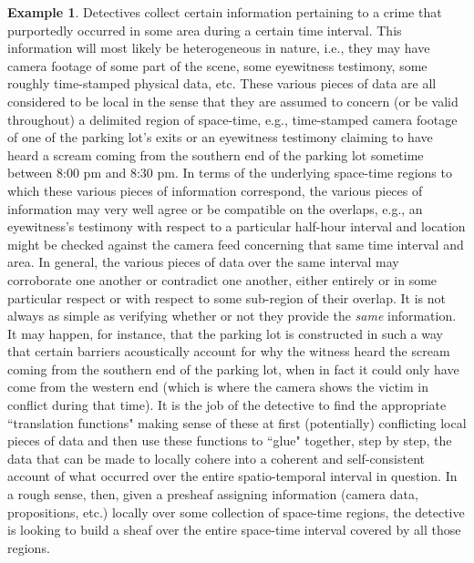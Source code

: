 \documentclass[11pt]{book}
\theoremstyle{definition}
\newtheorem{example}{Example}[section]
\theoremstyle{definition}
\theoremstyle{definition}
\theoremstyle{theorem}
\theoremstyle{definition}
\begin{document}
\begin{example}
	Detectives collect certain information pertaining to a crime that purportedly occurred in some area during a certain time interval. This information will most likely be heterogeneous in nature, i.e., they may have camera footage of some part of the scene, some eyewitness testimony, some roughly time-stamped physical data, etc. These various pieces of data are all considered to be local in the sense that they are assumed to concern (or be valid throughout) a delimited region of space-time, e.g., time-stamped camera footage of one of the parking lot's exits or an eyewitness testimony claiming to have heard a scream coming from the southern end of the parking lot sometime between 8:00 pm and 8:30 pm. In terms of the underlying space-time regions to which these various pieces of information correspond, the various pieces of information may very well agree or be compatible on the overlaps, e.g., an eyewitness's testimony with respect to a particular half-hour interval and location might be checked against the camera feed concerning that same time interval and area. In general, the various pieces of data over the same interval may corroborate one another or contradict one another, either entirely or in some particular respect or with respect to some sub-region of their overlap. It is not always as simple as verifying whether or not they provide the \textit{same} information. It may happen, for instance, that the parking lot is constructed in such a way that certain barriers acoustically account for why the witness heard the scream coming from the southern end of the parking lot, when in fact it could only have come from the western end (which is where the camera shows the victim in conflict during that time). It is the job of the detective to find the appropriate ``translation functions" making sense of these at first (potentially) conflicting local pieces of data and then use these functions to ``glue" together, step by step, the data that can be made to locally cohere into a coherent and self-consistent account of what occurred over the entire spatio-temporal interval in question. In a rough sense, then, given a presheaf assigning information (camera data, propositions, etc.) locally over some collection of space-time regions, the detective is looking to build a sheaf over the entire space-time interval covered by all those regions.\par 

\end{example}
\end{document}
